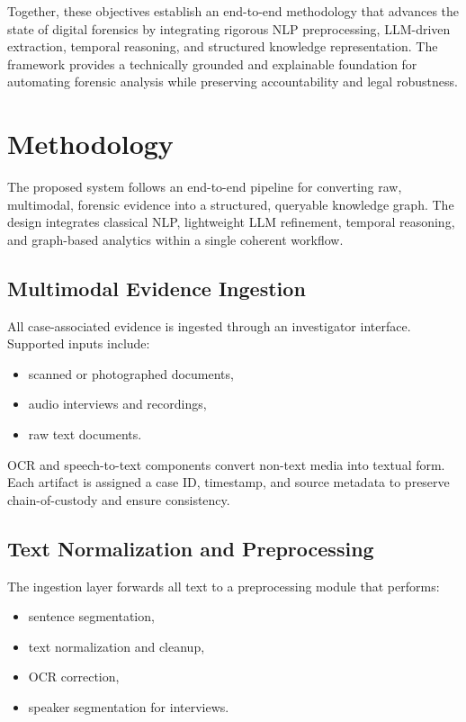 \documentclass{ieeeaccess}
\begin{document}
Together, these objectives establish an end-to-end methodology that advances the state of digital forensics by integrating rigorous NLP preprocessing, LLM-driven extraction, temporal reasoning, and structured knowledge representation. The framework provides a technically grounded and explainable foundation for automating forensic analysis while preserving accountability and legal robustness.

\section{Methodology}

The proposed system follows an end-to-end pipeline for converting raw, multimodal, forensic evidence into a structured, queryable knowledge graph. The design integrates classical NLP, lightweight LLM refinement, temporal reasoning, and graph-based analytics within a single coherent workflow.

\subsection{Multimodal Evidence Ingestion}
All case-associated evidence is ingested through an investigator interface. Supported inputs include:
\begin{itemize}
    \item scanned or photographed documents,
    \item audio interviews and recordings,
    \item raw text documents.
\end{itemize}

OCR and speech-to-text components convert non-text media into textual form. Each artifact is assigned a case ID, timestamp, and source metadata to preserve chain-of-custody and ensure consistency.

\subsection{Text Normalization and Preprocessing}
The ingestion layer forwards all text to a preprocessing module that performs:
\begin{itemize}
    \item sentence segmentation,
    \item text normalization and cleanup,
    \item OCR correction,
    \item speaker segmentation for interviews.
\end{itemize}
\end{document}
